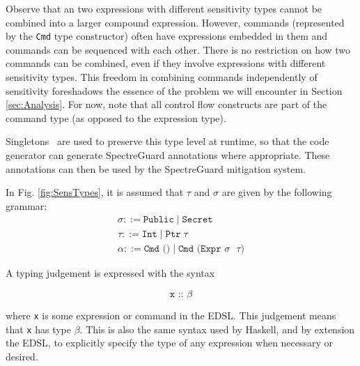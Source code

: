 \documentclass[10pt, conference]{IEEEtran}
\newcommand{\ttt}{\texttt}
\begin{document}
Observe that an two expressions with different sensitivity types cannot be
combined into a larger compound expression. However, commands (represented by
the \verb|Cmd| type constructor) often have expressions embedded in them and
commands can be sequenced with each other.  There is no restriction on how two
commands can be combined, even if they involve expressions with different
sensitivity types. This freedom in combining commands independently of
sensitivity foreshadows the essence of the problem we will encounter in
Section \ref{sec:Analysis}. For now, note that all control flow constructs are
part of the command type (as opposed to the expression type).

Singletons~\cite{SingletonsPaper} are used to preserve this type level at runtime, so that the
code generator can generate SpectreGuard annotations where appropriate. These annotations can
then be used by the SpectreGuard mitigation system.~\cite{SpectreGuard}

In Fig. \ref{fig:SensTypes}, it is assumed that $\tau$ and $\sigma$ are given by the
following grammar:
\begin{gather*}
  \sigma ::= \ttt{Public}\;|\;\ttt{Secret}\\
  \tau ::= \ttt{Int}\;|\;\ttt{Ptr}\;\tau\\
  \alpha ::= \ttt{Cmd ()}\;|\;\ttt{Cmd (Expr $\sigma$ $\tau$)}
\end{gather*}

\noindent A typing judgement is expressed with the syntax

\begin{equation*}
  \ttt{x :: $\beta$}
\end{equation*}

\noindent where \ttt{x} is some expression or command in the EDSL. This judgement means
that \ttt{x} has type $\beta$. This is also the same syntax used by Haskell, and by extension
the EDSL, to explicitly specify the type of any expression when necessary or desired.
\end{document}
